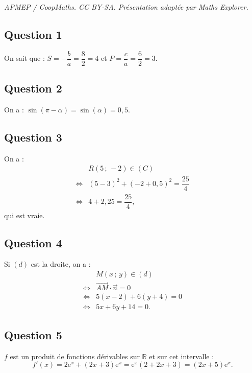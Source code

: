 \documentclass[10pt]{article}
\providecommand{\e}{{\mathrm{e}}}
\begin{document}
\noindent\textit{APMEP / CoopMaths. CC BY-SA. Présentation adaptée par Maths Explorer.}\par\medskip
\subsection*{Question 1}

On sait que : \(S = -\dfrac{b}{a} = \dfrac{8}{2} = 4\) et \(P = \dfrac{c}{a} = \dfrac{6}{2} = 3\).

\subsection*{Question 2}

On a : \(\sin(\pi - \alpha) = \sin(\alpha) = 0{,}5\).

\subsection*{Question 3}

On a :
\begin{align*}
&R(5\,;\,-2) \in (C) \\
\iff &(5 - 3)^2 + (-2 + 0{,}5)^2 = \dfrac{25}{4} \\
\iff &4 + 2{,}25 = \dfrac{25}{4},
\end{align*}
qui est vraie.

\subsection*{Question 4}

Si \((d)\) est la droite, on a :
\begin{align*}
&M(x\,;\,y) \in (d) \\
\iff &\overrightarrow{AM} \cdot \vec{n} = 0 \\
\iff &5(x - 2) + 6(y + 4) = 0 \\
\iff &5x + 6y + 14 = 0.
\end{align*}

\subsection*{Question 5}

\(f\) est un produit de fonctions dérivables sur \(\mathbb{R}\) et sur cet intervalle :
\[
f'(x) = 2\e^x + (2x + 3)\e^x = \e^x (2 + 2x + 3) = (2x + 5)\e^x.
\]
\end{document}
